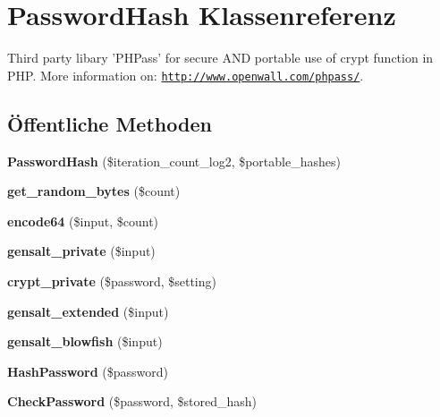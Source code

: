 \hypertarget{classPasswordHash}{\section{\-Password\-Hash \-Klassenreferenz}
\label{classPasswordHash}
}


\-Third party libary '\-P\-H\-Pass' for secure \-A\-N\-D portable use of crypt function in \-P\-H\-P. \-More information on\-: \href{http://www.openwall.com/phpass/}{\tt http\-://www.\-openwall.\-com/phpass/}.  


\subsection*{Öffentliche \-Methoden}
\begin{DoxyCompactItemize}
\item 
\hypertarget{classPasswordHash_a80cc3db37833042a8368e5998be81f81}{{\bfseries \-Password\-Hash} (\$iteration\-\_\-count\-\_\-log2, \$portable\-\_\-hashes)}\label{classPasswordHash_a80cc3db37833042a8368e5998be81f81}

\item 
\hypertarget{classPasswordHash_a2c24e85420b4bc0fe1c2dba4ef1701ed}{{\bfseries get\-\_\-random\-\_\-bytes} (\$count)}\label{classPasswordHash_a2c24e85420b4bc0fe1c2dba4ef1701ed}

\item 
\hypertarget{classPasswordHash_a3da1daa6bb776db3d149b19f491f7ac2}{{\bfseries encode64} (\$input, \$count)}\label{classPasswordHash_a3da1daa6bb776db3d149b19f491f7ac2}

\item 
\hypertarget{classPasswordHash_a8f046db3b35c42c9afa16066dd90a419}{{\bfseries gensalt\-\_\-private} (\$input)}\label{classPasswordHash_a8f046db3b35c42c9afa16066dd90a419}

\item 
\hypertarget{classPasswordHash_a5f21537b0741de59f80b4df4e6fd6c7c}{{\bfseries crypt\-\_\-private} (\$password, \$setting)}\label{classPasswordHash_a5f21537b0741de59f80b4df4e6fd6c7c}

\item 
\hypertarget{classPasswordHash_a0881b0369f5a410d9f5ec3426ac9ca88}{{\bfseries gensalt\-\_\-extended} (\$input)}\label{classPasswordHash_a0881b0369f5a410d9f5ec3426ac9ca88}

\item 
\hypertarget{classPasswordHash_a4ea37d614e0ab61dfcd240efb1b77378}{{\bfseries gensalt\-\_\-blowfish} (\$input)}\label{classPasswordHash_a4ea37d614e0ab61dfcd240efb1b77378}

\item 
\hypertarget{classPasswordHash_acbac54e12b04737c853feeaf0c3deec6}{{\bfseries \-Hash\-Password} (\$password)}\label{classPasswordHash_acbac54e12b04737c853feeaf0c3deec6}

\item 
\hypertarget{classPasswordHash_a3574f6a40e1f710656b4c816d5dde73b}{{\bfseries \-Check\-Password} (\$password, \$stored\-\_\-hash)}\label{classPasswordHash_a3574f6a40e1f710656b4c816d5dde73b}

\end{DoxyCompactItemize}
